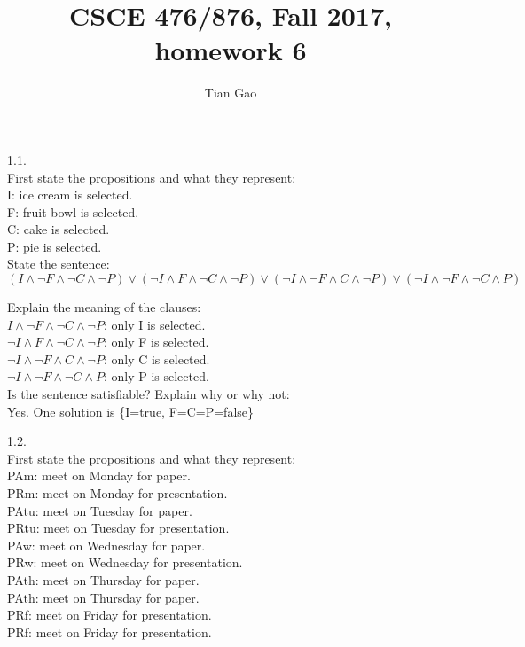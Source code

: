 \documentclass[a4paper]{article}
\title{CSCE 476/876, Fall 2017, homework 6}
\author{Tian Gao}
\begin{document}
\maketitle


1.1.\\
First state the propositions and what they represent:\\
I: ice cream is selected.\\
F: fruit bowl is selected.\\
C: cake is selected.\\
P: pie is selected.\\

State the sentence:\\
$(I\wedge  \neg F\wedge  \neg C\wedge  \neg P)\vee ( \neg I\wedge F\wedge  \neg C\wedge  \neg P)\vee ( \neg I\wedge  \neg F\wedge C\wedge  \neg P)\vee ( \neg I\wedge  \neg F\wedge  \neg C\wedge P)$

Explain the meaning of the clauses:\\
$I\wedge  \neg F\wedge  \neg C\wedge  \neg P$: only I is selected.\\
$ \neg I\wedge F\wedge  \neg C\wedge  \neg P$: only F is selected.\\
$ \neg I\wedge  \neg F\wedge C\wedge  \neg P$: only C is selected.\\
$ \neg I\wedge  \neg F\wedge  \neg C\wedge P$: only P is selected.\\

Is the sentence satisfiable? Explain why or why not:\\
Yes. One solution is \{I=true, F=C=P=false\}

1.2.\\
First state the propositions and what they represent:\\
PAm: meet on Monday for paper.\\
PRm: meet on Monday for presentation.\\
PAtu: meet on Tuesday for paper.\\
PRtu: meet on Tuesday for presentation.\\
PAw: meet on Wednesday for paper.\\
PRw: meet on Wednesday for presentation.\\
PAth: meet on Thursday for paper.\\
PAth: meet on Thursday for paper.\\
PRf: meet on Friday for presentation.\\
PRf: meet on Friday for presentation.\\
\end{document}
